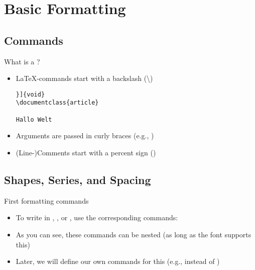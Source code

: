 \section{Basic Formatting}

\subsection{Commands}

\begin{frame}[fragile]{What is a ?}
\begin{itemize}
   \itemsep8pt
   \item \LaTeX-commands start with a backslash (\textbackslash)
{\color{lightgray}\begin{verbatim}}]{void}
\documentclass{article}

Hallo Welt

\end{verbatim}
}
   \item Arguments are passed in curly braces (e.g., )
   \item (Line-)Comments start with a percent sign (\T{\%})
\end{itemize}
\end{frame}

\subsection{Shapes, Series, and Spacing}

\begin{frame}[fragile]{First formatting commands}
   \begin{itemize}
      \itemsep8pt
      \item To write in , , or , use the corresponding commands:
      \item As you can see, these commands can be nested (as long as the font supports this)
      \item Later, we will define our own commands for this  (e.g.,  instead of )
   \end{itemize}
\end{frame}

